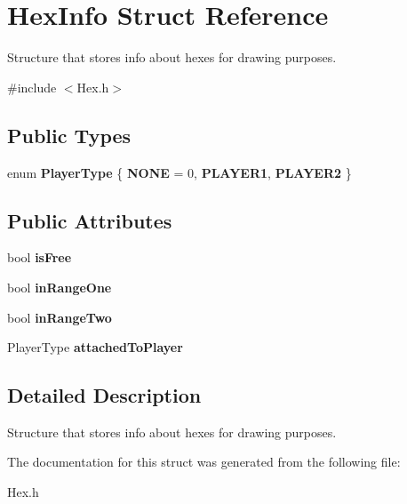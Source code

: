 \hypertarget{structHexInfo}{}\section{Hex\+Info Struct Reference}
\label{structHexInfo}


Structure that stores info about hexes for drawing purposes.  




{\ttfamily \#include $<$Hex.\+h$>$}

\subsection*{Public Types}
\begin{DoxyCompactItemize}
\item 
enum {\bfseries Player\+Type} \{ {\bfseries N\+O\+NE} = 0, 
{\bfseries P\+L\+A\+Y\+E\+R1}, 
{\bfseries P\+L\+A\+Y\+E\+R2}
 \}\hypertarget{structHexInfo_ae1fffa5226279b69b51f760d2bf51179}{}\label{structHexInfo_ae1fffa5226279b69b51f760d2bf51179}

\end{DoxyCompactItemize}
\subsection*{Public Attributes}
\begin{DoxyCompactItemize}
\item 
bool {\bfseries is\+Free}\hypertarget{structHexInfo_a02a10e988abd36762005497af0647790}{}\label{structHexInfo_a02a10e988abd36762005497af0647790}

\item 
bool {\bfseries in\+Range\+One}\hypertarget{structHexInfo_ac7c21a3866bd0e3b32698017c4a221b0}{}\label{structHexInfo_ac7c21a3866bd0e3b32698017c4a221b0}

\item 
bool {\bfseries in\+Range\+Two}\hypertarget{structHexInfo_af51a17c792cabb034cb360863a44f88a}{}\label{structHexInfo_af51a17c792cabb034cb360863a44f88a}

\item 
Player\+Type {\bfseries attached\+To\+Player}\hypertarget{structHexInfo_a46db57c576280a9da871abe00f880223}{}\label{structHexInfo_a46db57c576280a9da871abe00f880223}

\end{DoxyCompactItemize}


\subsection{Detailed Description}
Structure that stores info about hexes for drawing purposes. 

The documentation for this struct was generated from the following file\+:\begin{DoxyCompactItemize}
\item 
Hex.\+h\end{DoxyCompactItemize}
